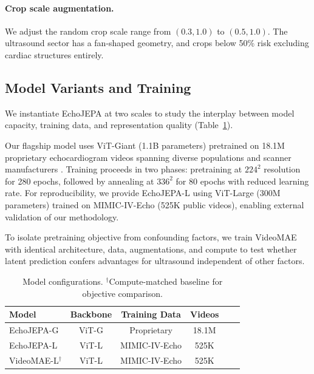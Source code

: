 \documentclass{article}
\theoremstyle{plain}
\theoremstyle{definition}
\theoremstyle{remark}
\begin{document}
\paragraph{Crop scale augmentation.}
We adjust the random crop scale range from $(0.3, 1.0)$ to $(0.5, 1.0)$. The ultrasound sector has a fan-shaped geometry, and crops below 50\% risk excluding cardiac structures entirely.


\subsection{Model Variants and Training}
\label{sec:method:models}


We instantiate EchoJEPA at two scales to study the interplay between model capacity, training data, and representation quality (Table~\ref{tab:models}).

Our flagship model uses ViT-Giant (1.1B parameters) pretrained on 18.1M proprietary echocardiogram videos spanning diverse populations and scanner manufacturers \citep{dosovitskiy2021imageworth16x16words}. Training proceeds in two phases: pretraining at $224^2$ resolution for 280 epochs, followed by annealing at $336^2$ for 80 epochs with reduced learning rate. For reproducibility, we provide EchoJEPA-L using ViT-Large (300M parameters) trained on MIMIC-IV-Echo \citep{PhysioNet-mimic-iv-echo-0.1} (525K public videos), enabling external validation of our methodology.

To isolate pretraining objective from confounding factors, we train VideoMAE \citep{videomae} with identical architecture, data, augmentations, and compute to test whether latent prediction confers advantages for ultrasound independent of other factors.



\begin{table}[b]
\centering
\caption{Model configurations. $^\dagger$Compute-matched baseline for objective comparison.}
\label{tab:models}
\vspace{0.5em}
\small
\begin{tabular}{@{}lccccc@{}}
\toprule
\textbf{Model} & \textbf{Backbone} & \textbf{Training Data} & \textbf{Videos} \\
\midrule
EchoJEPA-G & ViT-G & Proprietary &  18.1M \\
EchoJEPA-L & ViT-L & MIMIC-IV-Echo & 525K \\
VideoMAE-L$^\dagger$ & ViT-L & MIMIC-IV-Echo & 525K  \\
\bottomrule
\end{tabular}
\end{table}
\end{document}
